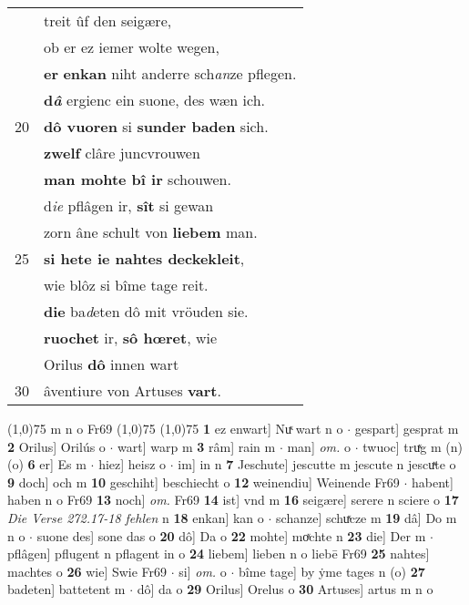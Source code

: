 \documentclass[8pt,a4paper,notitlepage]{article}
\begin{document}
\begin{table}[ht]
\begin{minipage}[t]{0.5\linewidth}
\begin{tabular}{rl}
 & treit ûf den seigære,\\ 
 & ob er ez iemer wolte wegen,\\ 
 & \textbf{er} \textbf{en}\textbf{kan} niht anderre sch\textit{an}ze pflegen.\\ 
 & \textbf{d\textit{â}} ergienc ein suone, des wæn ich.\\ 
20 & \textbf{dô vuoren} si \textbf{sunder baden} sich.\\ 
 & \textbf{zwelf} clâre juncvrouwen\\ 
 & \textbf{man mohte bî ir} schouwen.\\ 
 & d\textit{ie} pflâgen ir, \textbf{sît} si gewan\\ 
 & zorn âne schult von \textbf{liebem} man.\\ 
25 & \textbf{si hete ie nahtes deckekleit},\\ 
 & wie blôz si bîme tage reit.\\ 
 & \textbf{die} ba\textit{d}eten dô mit vröuden sie.\\ 
 & \textbf{ruochet} ir, \textbf{sô hœret}, wie\\ 
 & Orilus \textbf{dô} innen wart\\ 
30 & âventiure von Artuses \textbf{vart}.\\ 
\end{tabular}
\scriptsize
\line(1,0){75} \newline
m n o Fr69 \newline
\line(1,0){75} \newline
\newline
\line(1,0){75} \newline
\textbf{1} ez enwart] Nuͯ wart n o  $\cdot$ gespart] gesprat m \textbf{2} Orilus] Orilús o  $\cdot$ wart] warp m \textbf{3} râm] rain m  $\cdot$ man] \textit{om.} o  $\cdot$ twuoc] truͯg m (n) (o) \textbf{6} er] Es m  $\cdot$ hiez] heisz o  $\cdot$ im] in n \textbf{7} Jeschute] jescutte m jescute n jescuͯte o \textbf{9} doch] och m \textbf{10} geschiht] beschiecht o \textbf{12} weinendiu] Weinende Fr69  $\cdot$ habent] haben n o Fr69 \textbf{13} noch] \textit{om.} Fr69 \textbf{14} ist] vnd m \textbf{16} seigære] serere n sciere o \textbf{17} \textit{Die Verse 272.17-18 fehlen} n  \textbf{18} enkan] kan o  $\cdot$ schanze] schuͯcze m \textbf{19} dâ] Do m n o  $\cdot$ suone des] sone das o \textbf{20} dô] Da o \textbf{22} mohte] moͯchte n \textbf{23} die] Der m  $\cdot$ pflâgen] pflugent n pflagent in o \textbf{24} liebem] lieben n o liebē Fr69 \textbf{25} nahtes] machtes o \textbf{26} wie] Swie Fr69  $\cdot$ si] \textit{om.} o  $\cdot$ bîme tage] by ẏme tages n (o) \textbf{27} badeten] battetent m  $\cdot$ dô] da o \textbf{29} Orilus] Orelus o \textbf{30} Artuses] artus m n o \newline
\end{minipage}
\end{table}
\end{document}
